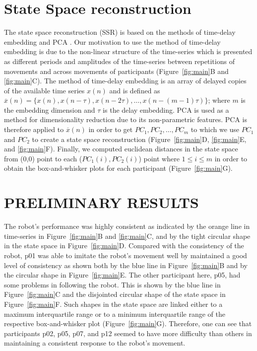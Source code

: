 \documentclass{sig-alternate-05-2015}
\begin{document}
\section{State Space reconstruction}

The state space reconstruction (SSR) is based on the methods of time-delay embedding and PCA \cite{Gibson1992}.
Our motivation to use the method of time-delay embedding
is due to the non-linear structure of the time-series
which is 
presented 
as
different periods and amplitudes of the time-series 
between repetitions of movements and across movements of participants (Figure~\ref{fig:main}B and \ref{fig:main}C).
The method of time-delay embedding is an array of 
delayed copies of the available time series $x(n)$ and is defined as  
$ \overline{x}(n) = \{  x(n), x(n-\tau), x(n-2\tau), \dots,x(n-(m-1)\tau)\}$;
where $m$ is the embedding dimension and $\tau$ is the delay embedding.
PCA is used as a method for dimensionality reduction due to its non-parametric features.
PCA is therefore applied to $ \overline{x}(n)$ in order to get $PC_1, PC_2, \dots, PC_m$ 
to which we use $PC_1$ and $PC_2$ 
to create a state space reconstruction (Figure~\ref{fig:main}D, \ref{fig:main}E, and \ref{fig:main}F).
Finally, we computed euclidean distances in the state space 
from (0,0) point to each ($PC_1(i),PC_2(i)$) point where $1 \leq i \leq m$
in order to obtain the box-and-whisker plots for each participant (Figure~\ref{fig:main}G).


\section{PRELIMINARY RESULTS}

The robot's performance was highly consistent 
as indicated by the orange line in time-series in Figure~\ref{fig:main}B and \ref{fig:main}C,
and by the tight circular shape in the state space in Figure~\ref{fig:main}D.
Compared with the consistency of the robot, 
p01 was able to imitate the robot's movement well by maintained a good level of consistency
as shown both 
by the blue line in Figure~\ref{fig:main}B and 
by the circular shape in Figure~\ref{fig:main}E.
The other participant here, p05, had some problems in following the robot.
This is shown by the blue line in 
Figure~\ref{fig:main}C and the disjointed circular shape 
of the  state space in Figure~\ref{fig:main}F.
Such shapes in the  state space are linked either 
to a maximum interquartile range
or 
to a minimum interquartile range of the respective box-and-whisker plot (Figure~\ref{fig:main}G).
Therefore, one  can see that participants p02, p05, p07, and p12 seemed
to have more difficulty than others in maintaining a consistent response
to the robot's movement.
\end{document}
